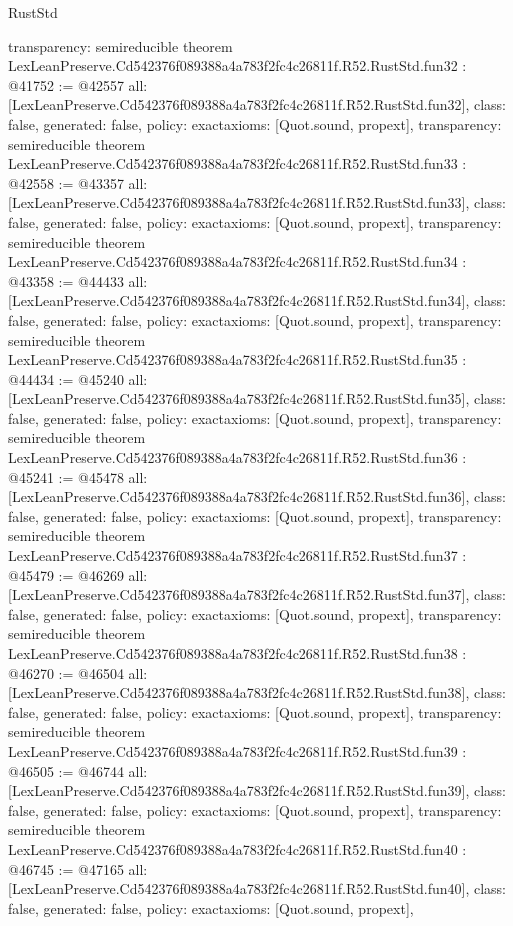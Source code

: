 \begin{lexlean}{RustStd}
\begin{coremodule}
{  transparency: semireducible
}
theorem LexLeanPreserve.Cd542376f089388a4a783f2fc4c26811f.R52.RustStd.fun32 : @41752 := @42557 {
  all: [LexLeanPreserve.Cd542376f089388a4a783f2fc4c26811f.R52.RustStd.fun32],
  class: false,
  generated: false,
  policy: exact{axioms: [Quot.sound, propext]},
  transparency: semireducible
}
theorem LexLeanPreserve.Cd542376f089388a4a783f2fc4c26811f.R52.RustStd.fun33 : @42558 := @43357 {
  all: [LexLeanPreserve.Cd542376f089388a4a783f2fc4c26811f.R52.RustStd.fun33],
  class: false,
  generated: false,
  policy: exact{axioms: [Quot.sound, propext]},
  transparency: semireducible
}
theorem LexLeanPreserve.Cd542376f089388a4a783f2fc4c26811f.R52.RustStd.fun34 : @43358 := @44433 {
  all: [LexLeanPreserve.Cd542376f089388a4a783f2fc4c26811f.R52.RustStd.fun34],
  class: false,
  generated: false,
  policy: exact{axioms: [Quot.sound, propext]},
  transparency: semireducible
}
theorem LexLeanPreserve.Cd542376f089388a4a783f2fc4c26811f.R52.RustStd.fun35 : @44434 := @45240 {
  all: [LexLeanPreserve.Cd542376f089388a4a783f2fc4c26811f.R52.RustStd.fun35],
  class: false,
  generated: false,
  policy: exact{axioms: [Quot.sound, propext]},
  transparency: semireducible
}
theorem LexLeanPreserve.Cd542376f089388a4a783f2fc4c26811f.R52.RustStd.fun36 : @45241 := @45478 {
  all: [LexLeanPreserve.Cd542376f089388a4a783f2fc4c26811f.R52.RustStd.fun36],
  class: false,
  generated: false,
  policy: exact{axioms: [Quot.sound, propext]},
  transparency: semireducible
}
theorem LexLeanPreserve.Cd542376f089388a4a783f2fc4c26811f.R52.RustStd.fun37 : @45479 := @46269 {
  all: [LexLeanPreserve.Cd542376f089388a4a783f2fc4c26811f.R52.RustStd.fun37],
  class: false,
  generated: false,
  policy: exact{axioms: [Quot.sound, propext]},
  transparency: semireducible
}
theorem LexLeanPreserve.Cd542376f089388a4a783f2fc4c26811f.R52.RustStd.fun38 : @46270 := @46504 {
  all: [LexLeanPreserve.Cd542376f089388a4a783f2fc4c26811f.R52.RustStd.fun38],
  class: false,
  generated: false,
  policy: exact{axioms: [Quot.sound, propext]},
  transparency: semireducible
}
theorem LexLeanPreserve.Cd542376f089388a4a783f2fc4c26811f.R52.RustStd.fun39 : @46505 := @46744 {
  all: [LexLeanPreserve.Cd542376f089388a4a783f2fc4c26811f.R52.RustStd.fun39],
  class: false,
  generated: false,
  policy: exact{axioms: [Quot.sound, propext]},
  transparency: semireducible
}
theorem LexLeanPreserve.Cd542376f089388a4a783f2fc4c26811f.R52.RustStd.fun40 : @46745 := @47165 {
  all: [LexLeanPreserve.Cd542376f089388a4a783f2fc4c26811f.R52.RustStd.fun40],
  class: false,
  generated: false,
  policy: exact{axioms: [Quot.sound, propext]},
}
\end{coremodule}
\end{lexlean}
